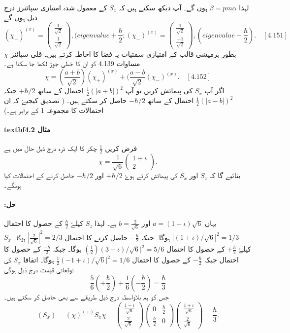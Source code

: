 \documentclass{book}
\begin{document}
لہذا $ \beta={pm}\alpha $ ہوں گے۔ آپ دیکھ سکتے ہیں کہ $ S_{x} $ کے معمول شدہ امتیازی سپائنرز درج ذیل ہوں گے
$$ (\chi_{+})^(x)=\left(\begin{matrix} \frac{1}{\sqrt{2}} \\ \frac{1}{\sqrt{2}} \end{matrix}\right), (eigenvalue+\frac{\hbar}{2}; (\chi_{-})^(x)= \left(\begin{matrix}\frac{1}{\sqrt{2}} \\ \frac{-1}{\sqrt{2}} \end{matrix}\right), (eigenvalue-\frac{\hbar}{2}). \quad[4.151] $$
بطور ہرمیشی قالب کے امتیازی سمتیات یہ فضا کا احاطہ کرتے ہیں۔ قلی سپائنر $ \chi $ مساوات 4.139 کو ان کا خطی جوڑ لکھا جا سکتا ہے۔
$$  \chi=(\frac{a+b}{\sqrt{2}})(\chi_{+})^(x) +( \frac{a-b}{\sqrt{2}}(\chi_{-})^(x). \quad [4.152] $$ 
اگر آپ $ S_{x} $ کی پیمائش کریں تو آپ $ \frac{1}{2}(|a+b|)^2 $ احتمال کے ساتھ $ +\hbar/2 $ جبکہ $ \frac{1}{2}(|a-b|)^2 $ احتمال کے ساتھ $ - \hbar/2 $ حاصل کر سکتے ہیں۔ ( تصدیق کیجیۓ کہ ان احتمالات کا مجموعہ 1 کے برابر ہے۔)
\paragraph{textbf{مثال 4.2 }} \quad فرض کریں $ \frac{1}{2} $ چکر کا ایک ذرہ درج ذیل حال میں ہے
$$ \chi=\frac{1}{\sqrt{6}}\left(\begin{matrix} 1+\iota \\ 2 \end{matrix}\right). $$
بتائیے گا کہ $ S_{z} $ اور $ S_{x} $ کی پیمائش کرتے ہوۓ $ +\hbar/2 $ اور $ -\hbar/2 $ حاصل کرنے کے احتمالات کیا ہونگے۔
\paragraph{:حل}
یہاں $ a=(1+\iota)\sqrt{6} $ اور $ b=\frac{2}{\sqrt{6}} $ ہے۔ لہذا $ S_{z} $ کیلۓ $ \frac{\hbar}{2} $ 
کے حصول کا احتمال $ |(1+\iota)/\sqrt{6}|^2=1/3 $ ہوگا۔ جبکہ $ -\frac{\hbar}{2} $ حاصل کرنے کا احتمال $ |\frac{2}{\sqrt{6}}|^2 =2/3 $ ہوگا۔ $ S_{x} $  کیلۓ $ +\frac{\hbar}{2} $ کے حصول کا احتمال $ (\frac{1}{2}) (3+\iota)/\sqrt{6}|^2=5/6 $ ہوگا۔ جبکہ $ \frac{-\hbar}{2} $ کے حصول کا احتمال
جبکہ $ -\frac{\hbar}{2} $ کے حصول کا احتمال $ \frac{1}{2} (-1+\iota)/\sqrt{6}|^2 =1/6 $  ہوگا۔ اتفاقا $ S_{x} $ کی توقعاتی قیمت درج ذیل ہوگی
$$ \frac{5}{6}(+\frac{\hbar}{2})+\frac{1}{6}(-\frac{\hbar}{2})=\frac{\hbar}{3} $$
جس کو ہم بلاواسطہ درج ذیل طریقے سے بھی حاصل کر سکتے ہیں۔
$$ (S_{x})=(\chi)^(+)S_{x}\chi=\left(\begin{matrix}\frac{1-\iota}{\sqrt{6}} \\ \frac{2}{\sqrt{6}} \end{matrix}\right)\left(\begin{matrix} 0&\frac{\hbar}{2} \\ \frac{\hbar}{2}&0 \end{matrix}\right)\left(\begin{matrix}\frac{1+\iota}{\sqrt{6}} \\ \frac{2}{\sqrt{6}}\end{matrix}\right)=\frac{\hbar}{3}. $$ 
\end{document}
